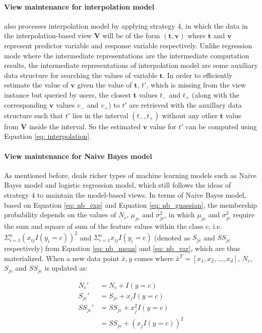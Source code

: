 \paragraph{View maintenance for interpolation model} \cite{deshpande2006mauvedb} also processes interpolation model by applying strategy 4, in which the data in the interpolation-based view $\textbf{V}$ will be of the form $(\textbf{t}, \textbf{v})$ where $\textbf{t}$ and $\textbf{v}$ represent predictor variable and response variable respectively. Unlike regression mode where the intermediate representations are the intermediate computation results, the intermediate representations of interpolation model are some auxiliary data structure for searching the values of variable $\textbf{t}$. In order to efficiently estimate the value of $\textbf{v}$ given the value of $\textbf{t}$, $t'$, which is missing from the view instance but queried by users, the closest $\textbf{t}$ values $t_{-}$ and $t_{+}$ (along with the corresponding $\textbf{v}$ values $v_{-}$ and $v_{+}$) to $t'$ are retrieved with the auxillary data structure such that $t'$ lies in the interval $(t_{-}, t_{+})$ without any other $\textbf{t}$ value from $\textbf{V}$ inside the interval. So the estimated $\textbf{v}$ value for $t'$ can be computed using Equation \ref{eq: interpolation}.


\paragraph{View maintenance for Naive Bayes model}
As mentioned before, \cite{gupta2015processing} deals richer types of machine learning models such as Naive Bayes model and logistic regression model, which still follows the ideas of strategy 4 to maintain the model-based views. In terms of Naive Bayes model, based on Equation \ref{eq: nb_exp} and Equation \ref{eq: nb_guassian}, the membership probability depends on the values of $N_c$, $\mu_{jc}$ and $\sigma_{jc}^2$, in which $\mu_{jc}$ and $\sigma_{jc}^2$ require the sum and square of sum of the feature values within the class $c$, i.e. $\Sigma_{i=1}^n(x_{ij}I(y_i=c))^2$ and $\Sigma_{i=1}^nx_{ij}I(y_i=c)$ (denoted as $S_{jc}$ and $SS_{jc}$ respectively) from Equation \ref{eq: nb_mean} and \ref{eq: nb_var}, which are thus materialized. When a new data point $\bar{x}, y$ comes where $\bar{x}^T = [x_1, x_2, \dots, x_d]$, $N_c$, $S_{jc}$ and $SS_{jc}$ is updated as:

\begin{equation}
    \begin{split}
        N_c' &= N_c + I(y=c)\\
        S_{jc}' &= S_{jc} + x_jI(y=c)\\
        SS_{jc}'&= SS_{jc} + x_j^2I(y=c)\\ &= SS_{jc} + (x_jI(y=c))^2
    \end{split}
\end{equation}

